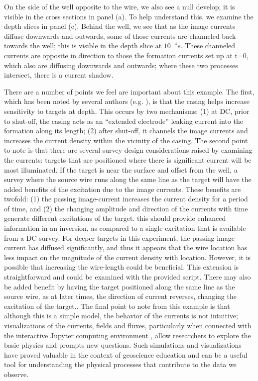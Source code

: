 On the side of the well opposite to the wire, we also see a null develop; it is visible in the cross sections in panel (a). To help understand this, we examine the depth slices in panel (c). Behind the well, we see that as the image currents diffuse downwards and outwards, some of those currents are channeled back towards the well; this is visible in the depth slice at $10^{-4} s$. These channeled currents are opposite in direction to those the formation currents set up at t=0, which also are diffusing downwards and outwards; where these two processes intersect, there is a current shadow.

There are a number of points we feel are important about this example. The first, which has been noted by several authors (e.g. \cite{Schenkel1994, Hoversten2015}), is that the casing helps increase sensitivity to targets at depth. This occurs by two mechanisms: (1) at DC, prior to shut-off, the casing acts as an ``extended electrode'' leaking current into the formation along its length; (2) after shut-off, it channels the image currents and increases the current density within the vicinity of the casing. The second point to note is that there are several survey design considerations raised by examining the currents: targets that are positioned where there is significant current will be most illuminated. If the target is near the surface and offset from the well, a survey where the source wire runs along the same line as the target will have the added benefits of the excitation due to the image currents. These benefits are twofold: (1) the passing image-current increases the current density for a period of time, and (2) the changing amplitude and direction of the currents with time generate different excitations of the target. this should provide enhanced information in an inversion, as compared to a single excitation that is available from a DC survey. For deeper targets in this experiment, the passing image current has diffused significantly, and thus it appears that the wire location has less impact on the magnitude of the current density with location. However, it is possible that increasing the wire-length could be beneficial. This extension is straightforward and could be examined with the provided script. There may also be added benefit by having the target positioned along the same line as the source wire, as at later times, the direction of current reverses, changing the excitation of the target.. The final point to note from this example is that although this is a simple model, the behavior of the currents is not intuitive; visualizations of the currents, fields and fluxes, particularly when connected with the interactive Jupyter computing environment \citep{Perez2015}, allow researchers to explore the basic physics and prompts new questions. Such simulations and visualizations have proved valuable in the context of geoscience education \citep{Oldenburg2017} and can be a useful tool for understanding the physical processes that contribute to the data we observe.




